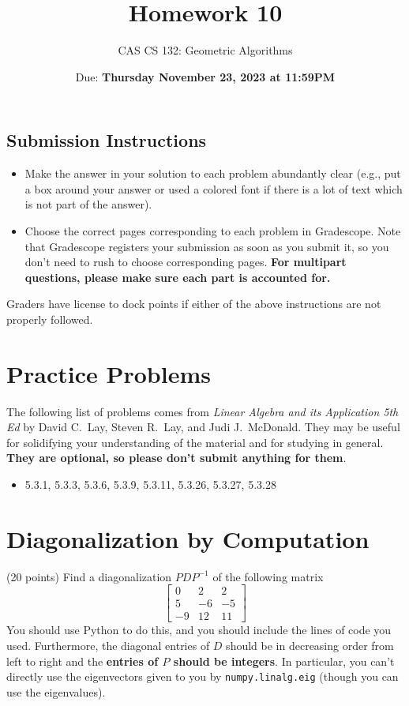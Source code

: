 \documentclass{article}
\title{
  Homework 10
}
\author{CAS CS 132: Geometric Algorithms}
\date{Due: \textbf{Thursday November 23, 2023 at 11:59PM}}
\theoremstyle{remark}
\begin{document}
\maketitle

\subsection*{Submission Instructions}
\begin{itemize}
\item Make the answer in your solution to each problem abundantly clear (e.g., put a box around your answer or used a colored font if there is a lot of text which is not part of the answer).
\item Choose the correct pages corresponding to each problem in Gradescope. Note that Gradescope registers your submission as soon as you submit it, so you don't need to rush to choose corresponding pages.
  \textbf{For multipart questions, please make sure each part is accounted for.}
\end{itemize}
Graders have license to dock points if either of the above instructions are not properly followed.


\section*{Practice Problems}

The following list of problems comes from \textit{Linear Algebra and its Application 5th Ed} by David C.\ Lay, Steven R.\ Lay, and Judi J.\ McDonald.
They may be useful for solidifying your understanding of the material and for studying in general.
\textbf{They are optional, so please don't submit anything for them}.

\begin{itemize}
\item 5.3.1, 5.3.3, 5.3.6, 5.3.9, 5.3.11, 5.3.26, 5.3.27, 5.3.28
\end{itemize}

\pagebreak
\section{Diagonalization by Computation}

(20 points) Find a diagonalization $PDP^{-1}$ of the following matrix
\begin{displaymath}
  \begin{bmatrix}
    0 & 2 & 2 \\
    5 & -6 & -5 \\
    -9 & 12 & 11
  \end{bmatrix}
\end{displaymath}
You should use Python to do this, and you should include the lines of code you used.
Furthermore, the diagonal entries of $D$ should be in decreasing order from left to right and the \textbf{entries of $P$ should be integers}.
In particular, you can't directly use the eigenvectors given to you by \texttt{numpy.linalg.eig} (though you can use the eigenvalues).
\end{document}
